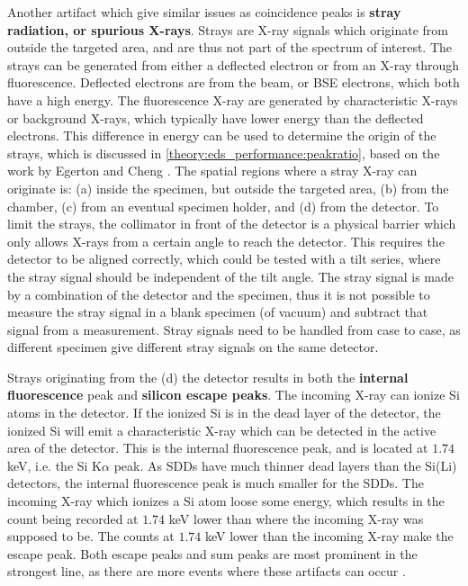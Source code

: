Another artifact which give similar issues as coincidence peaks is \textbf{stray radiation, or spurious X-rays}.
Strays are X-ray signals which originate from outside the targeted area, and are thus not part of the spectrum of interest.
The strays can be generated from either a deflected electron or from an X-ray through fluorescence.
Deflected electrons are from the beam, or BSE electrons, which both have a high energy.
The fluorescence X-ray are generated by characteristic X-rays or background X-rays, which typically have lower energy than the deflected electrons.
This difference in energy can be used to determine the origin of the strays, which is discussed in \cref{theory:eds_performance:peakratio}, based on the work by Egerton and Cheng \cite{egerton_nio_characterization_1994}.
The spatial regions where a stray X-ray can originate is: (a) inside the specimen, but outside the targeted area, (b) from the chamber, (c) from an eventual specimen holder, and (d) from the detector.
To limit the strays, the collimator in front of the detector is a physical barrier which only allows X-rays from a certain angle to reach the detector.
This requires the detector to be aligned correctly, which could be tested with a tilt series, where the stray signal should be independent of the tilt angle.
The stray signal is made by a combination of the detector and the specimen, thus it is not possible to measure the stray signal in a blank specimen (of vacuum) and subtract that signal from a measurement.
Stray signals need to be handled from case to case, as different specimen give different stray signals on the same detector.


Strays originating from the (d) the detector results in both the \textbf{internal fluorescence} peak and \textbf{silicon escape peaks}.
The incoming X-ray can ionize Si atoms in the detector.
If the ionized Si is in the dead layer of the detector, the ionized Si will emit a characteristic X-ray which can be detected in the active area of the detector.
This is the internal fluorescence peak, and is located at $1.74$ keV, i.e. the Si K$\alpha$ peak.
As SDDs have much thinner dead layers than the Si(Li) detectors, the internal fluorescence peak is much smaller for the SDDs.
The incoming X-ray which ionizes a Si atom loose some energy, which results in the count being recorded at $1.74$ keV lower than where the incoming X-ray was supposed to be.
The counts at $1.74$ keV lower than the incoming X-ray make the escape peak.
Both escape peaks and sum peaks are most prominent in the strongest line, as there are more events where these artifacts can occur \cite{astm_e1508_eds_quantification}.


